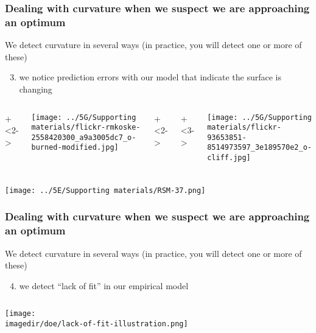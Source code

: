 \begin{frame}\frametitle{Dealing with curvature when we suspect we are approaching an optimum}
	{\color{myOrange}We detect curvature in several ways (in practice, you will detect one or more of these)}
	
	\vspace{.7cm}
	\begin{enumerate}\setcounter{enumi}{2}
		\item	we notice prediction errors with our model that indicate the surface is changing
	\end{enumerate}
	
	
	\vspace{.5cm}
	\begin{columns}[T]
			
			\onslide+<2->{
			
				\centerline{\texttt{[image: ../5G/Supporting materials/flickr-rmkoske-2558420300\_a9a3005dc7\_o-burned-modified.jpg]}}
			}
			
		
			\onslide+<2->{
			
				\vspace{.5cm}
				
			
			}
			\onslide+<3->{
				
				\centerline{\texttt{[image: ../5G/Supporting materials/flickr-93653851-8514973597\_3e189570e2\_o-cliff.jpg]}}
				\vspace{-1.2cm}
			}
	\end{columns}
	
\end{frame}

\begin{frame}\frametitle{}
	\centerline{\texttt{[image: ../5E/Supporting materials/RSM-37.png]}}
\end{frame}

\begin{frame}\frametitle{Dealing with curvature when we suspect we are approaching an optimum}
	{\color{myOrange}We detect curvature in several ways (in practice, you will detect one or more of these)}
	
	\vspace{.7cm}
	\begin{enumerate}\setcounter{enumi}{3}
		\item	we detect ``lack of fit'' in our empirical model
	\end{enumerate}
	
	\begin{columns}[T]

			
			\centerline{\texttt{[image: \\imagedir/doe/lack-of-fit-illustration.png]}}
	\end{columns}
	
\end{frame}

